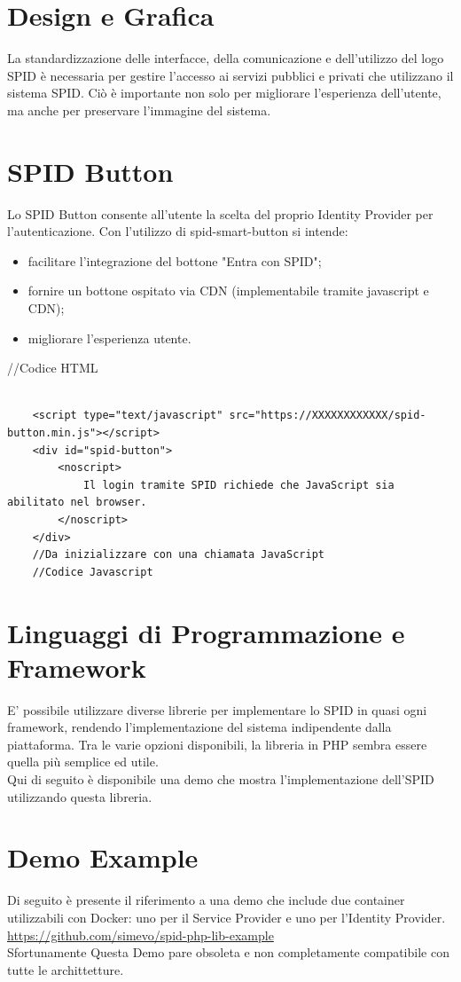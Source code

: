\section{Design e Grafica}
La standardizzazione delle interfacce, della comunicazione e dell'utilizzo del logo SPID è necessaria per gestire l'accesso ai 
servizi pubblici e privati che utilizzano il sistema SPID. Ciò è importante non solo per migliorare l'esperienza dell'utente, 
ma anche per preservare l'immagine del sistema.

\section{SPID Button}
Lo SPID Button consente all'utente la scelta del proprio Identity Provider per l'autenticazione.
Con l'utilizzo di spid-smart-button si intende:
\begin{itemize}
    \item facilitare l'integrazione del bottone "Entra con SPID";
    \item fornire un bottone ospitato via CDN (implementabile tramite javascript e CDN);
    \item migliorare l'esperienza utente.
\end{itemize}

//Codice HTML\\
\begin{verbatim}

    <script type="text/javascript" src="https://XXXXXXXXXXXX/spid-button.min.js"></script>
    <div id="spid-button">
        <noscript> 
            Il login tramite SPID richiede che JavaScript sia abilitato nel browser.
        </noscript>
    </div>
    //Da inizializzare con una chiamata JavaScript
    //Codice Javascript
\end{verbatim}

\section{Linguaggi di Programmazione e Framework}
E' possibile utilizzare diverse librerie per implementare lo SPID in quasi ogni framework, rendendo l'implementazione del sistema 
indipendente dalla piattaforma. Tra le varie opzioni disponibili, la libreria in PHP sembra essere quella più semplice ed utile. \\
Qui di seguito è disponibile una demo che mostra l'implementazione dell'SPID utilizzando questa libreria.

\section{Demo Example}
Di seguito è presente il riferimento a una demo che include due container utilizzabili con Docker: uno per il Service Provider 
e uno per l'Identity Provider.
\\ \url{https://github.com/simevo/spid-php-lib-example}
\\ Sfortunamente Questa Demo pare obsoleta e non completamente compatibile con tutte le archittetture.


